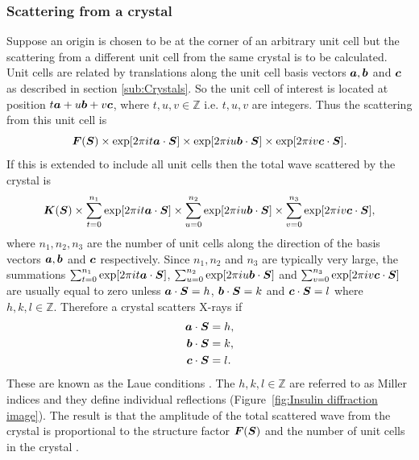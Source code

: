         \subsubsection{Scattering from a crystal}
        \label{subs:Scattering from a crystal}
            Suppose an origin is chosen to be at the corner of an arbitrary unit cell but the scattering from a different unit cell from the same crystal is to be calculated.
            Unit cells are related by translations along the unit cell basis vectors $\boldsymbol{a}, \boldsymbol{b}$ and  $\boldsymbol{c}$ as described in section \ref{sub:Crystals}.
            So the unit cell of interest is located at position $t\boldsymbol{a} + u\boldsymbol{b} + v\boldsymbol{c}$, where $t,u,v \in \mathbb{Z}$ i.e. $t,u,v$ are integers.
            Thus the scattering from this unit cell is
            \begin{equation}
                \boldsymbol{F}(\boldsymbol{S}) \times \exp[2\pi i t\boldsymbol{a} \cdot \boldsymbol{S}] \times \exp[2\pi i u\boldsymbol{b} \cdot \boldsymbol{S}] \times \exp[2\pi i v\boldsymbol{c} \cdot \boldsymbol{S}].
            \end{equation}
            If this is extended to include all unit cells then the total wave scattered by the crystal is
            \begin{equation}
                \boldsymbol{K}(\boldsymbol{S}) \times \sum_{t=0}^{n_1}\exp[2\pi i t\boldsymbol{a} \cdot \boldsymbol{S}] \times \sum_{u=0}^{n_2}\exp[2\pi i u\boldsymbol{b} \cdot \boldsymbol{S}] \times \sum_{v=0}^{n_3}\exp[2\pi i v\boldsymbol{c} \cdot \boldsymbol{S}],
            \end{equation}
            where $n_1, n_2, n_3$ are the number of unit cells along the direction of the basis vectors $\boldsymbol{a}, \boldsymbol{b}$ and $\boldsymbol{c}$ respectively.
            Since $n_1, n_2$ and $n_3$ are typically very large, the summations
            $\sum_{t=0}^{n_1}\exp[2\pi i t\boldsymbol{a} \cdot \boldsymbol{S}]$, $\sum_{u=0}^{n_2}\exp[2\pi i u\boldsymbol{b} \cdot \boldsymbol{S}]$ and $\sum_{v=0}^{n_3}\exp[2\pi i v\boldsymbol{c} \cdot \boldsymbol{S}]$
            are usually equal to zero unless $\boldsymbol{a} \cdot \boldsymbol{S} = h$, $\boldsymbol{b} \cdot \boldsymbol{S} = k$ and $\boldsymbol{c} \cdot \boldsymbol{S} = l$ where $h,k,l \in \mathbb{Z}$.
            Therefore a crystal scatters X-rays if
            \begin{align}
                \boldsymbol{a} \cdot \boldsymbol{S} &= h, \\
                \boldsymbol{b} \cdot \boldsymbol{S} &= k, \\
                \boldsymbol{c} \cdot \boldsymbol{S} &= l.
                \label{eq:Laue conditions}
            \end{align}
            These are known as the Laue conditions \cite{drenth1999}. The $h,k,l \in \mathbb{Z}$ are referred to as Miller indices and they define individual reflections (Figure~\ref{fig:Insulin diffraction image}). The result is that the amplitude of the total scattered wave from the crystal is proportional to the structure factor $\boldsymbol{F}(\boldsymbol{S})$ and the number of unit cells in the crystal \cite{drenth1999}.


